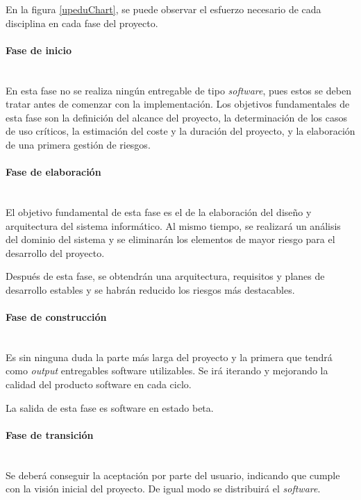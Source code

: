 \documentclass[twoside]{report}
\begin{document}
En la figura \ref{upeduChart}, se puede observar el esfuerzo necesario de cada disciplina en cada fase del proyecto.

\paragraph{Fase de inicio}\mbox{}\\

En esta fase no se realiza ningún entregable de tipo \textit{software}, pues estos se deben tratar antes de comenzar con la implementación. Los objetivos fundamentales de esta fase son la definición del alcance del proyecto,  la determinación de los casos de uso críticos, la estimación del coste y la duración del proyecto, y la elaboración de una primera gestión de riesgos.

\paragraph{Fase de elaboración}\mbox{}\\

El objetivo fundamental de esta fase \cite{pgpup} es el de la elaboración del diseño y arquitectura del sistema informático. Al mismo tiempo, se realizará un análisis del dominio del sistema y se eliminarán los elementos de mayor riesgo para el desarrollo del proyecto.

Después de esta fase, se obtendrán una arquitectura, requisitos y planes de desarrollo estables y se habrán reducido los riesgos más destacables.

\paragraph{Fase de construcción}\mbox{}\\

Es sin ninguna duda la parte más larga del proyecto y la primera que tendrá como \textit{output} entregables software utilizables. Se irá iterando y mejorando la calidad del producto software en cada ciclo.

La salida de esta fase \cite{pgpup} es software en estado beta.

\paragraph{Fase de transición}\mbox{}\\

Se deberá conseguir la aceptación por parte del usuario, indicando que cumple con la visión inicial del proyecto. De igual modo se distribuirá el \textit{software}.
\end{document}
